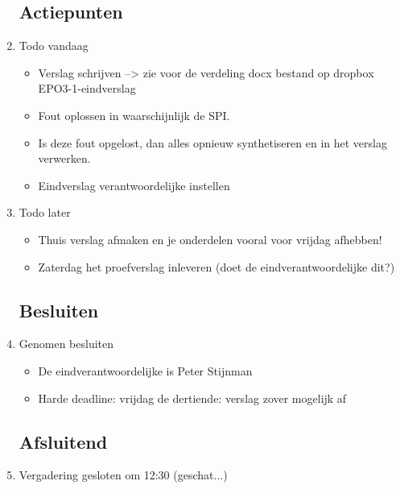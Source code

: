\documentclass{article}
\begin{document}
\begin{enumerate}
	\subsection*{Actiepunten}
	\item Todo vandaag
	\begin{itemize}
		\item Verslag schrijven --> zie voor de verdeling docx bestand op dropbox EPO3-1\Eindverslag\verdeling-eindverslag
		\item Fout oplossen in waarschijnlijk de SPI. 
		\item Is deze fout opgelost, dan alles opnieuw synthetiseren en in het verslag verwerken. 
		\item Eindverslag verantwoordelijke instellen

	\end{itemize}
	\item Todo later
	\begin{itemize}
		\item Thuis verslag afmaken en je onderdelen vooral voor vrijdag afhebben!
		\item Zaterdag het proefverslag inleveren  (doet de eindverantwoordelijke dit?)
	\end{itemize}

	\subsection*{Besluiten}
	\item Genomen besluiten
	\begin{itemize}
		\item De eindverantwoordelijke is Peter Stijnman
		\item Harde deadline: vrijdag de dertiende: verslag zover mogelijk af
		\end{itemize}

	\noindent 
	\subsection*{Afsluitend}
	\item Vergadering gesloten om 12:30 (geschat...)%

\end{enumerate}
\end{document}
